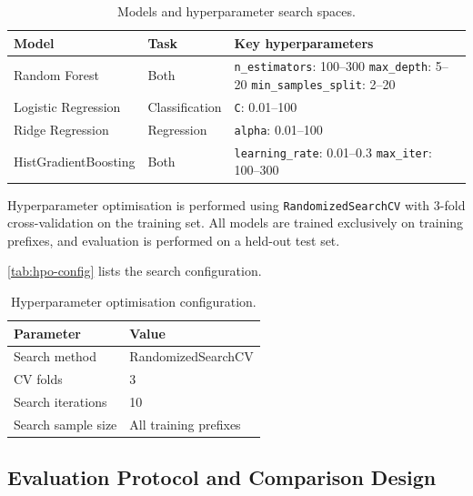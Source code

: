 \documentclass[runningheads]{llncs}
\begin{document}
\begin{table}[H]
    \centering
    \caption{Models and hyperparameter search spaces.}
    \label{tab:models}
    \begin{tabular}{llp{4.5cm}}
        \toprule
        Model & Task & Key hyperparameters \\
        \midrule
        Random Forest & Both &
            \texttt{n\_estimators}: 100--300\newline
            \texttt{max\_depth}: 5--20\newline
            \texttt{min\_samples\_split}: 2--20 \\
        Logistic Regression & Classification & \texttt{C}: 0.01--100 \\
        Ridge Regression & Regression & \texttt{alpha}: 0.01--100 \\
        HistGradientBoosting & Both &
            \texttt{learning\_rate}: 0.01--0.3\newline
            \texttt{max\_iter}: 100--300 \\
        \bottomrule
    \end{tabular}
\end{table}

Hyperparameter optimisation is performed using \texttt{RandomizedSearchCV}
with 3-fold cross-validation on the training set. All models
are trained exclusively on training prefixes, and evaluation is performed on a
held-out test set.

\autoref{tab:hpo-config} lists the search configuration.

\begin{table}[H]
    \centering
    \caption{Hyperparameter optimisation configuration.}
    \label{tab:hpo-config}
    \begin{tabular}{ll}
        \toprule
        Parameter & Value \\
        \midrule
        Search method & RandomizedSearchCV \\
        CV folds & 3 \\
        Search iterations & 10 \\
        Search sample size & All training prefixes \\
        \bottomrule
    \end{tabular}
\end{table}

\subsection{Evaluation Protocol and Comparison Design}
\label{sec:metrics}
\end{document}
